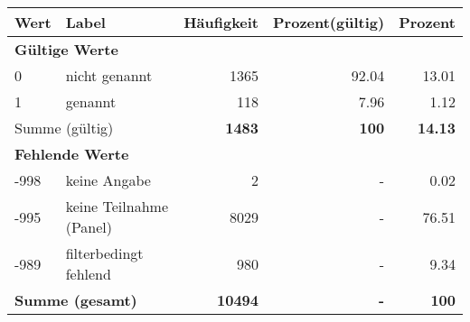     \begin{longtable}{lXrrr}
     \toprule
     \textbf{Wert} & \textbf{Label} & \textbf{Häufigkeit} & \textbf{Prozent(gültig)} & \textbf{Prozent} \\
     \endhead
     \midrule
     \multicolumn{5}{l}{\textbf{Gültige Werte}}\\

     0 &
     \multicolumn{1}{X}{ nicht genannt   } &


       \num{1365} &
       \num[round-mode=places,round-precision=2]{92.04} &
         \num[round-mode=places,round-precision=2]{13.01} \\

     1 &
     \multicolumn{1}{X}{ genannt   } &


       \num{118} &
       \num[round-mode=places,round-precision=2]{7.96} &
         \num[round-mode=places,round-precision=2]{1.12} \\
     \midrule
     \multicolumn{2}{l}{Summe (gültig)} &
       \textbf{\num{1483}} &
     \textbf{\num{100}} &
       \textbf{\num[round-mode=places,round-precision=2]{14.13}} \\
     \multicolumn{5}{l}{\textbf{Fehlende Werte}}\\
       -998 &
       keine Angabe &
         \num{2} &
        - &
         \num[round-mode=places,round-precision=2]{0.02} \\
       -995 &
       keine Teilnahme (Panel) &
         \num{8029} &
        - &
         \num[round-mode=places,round-precision=2]{76.51} \\
       -989 &
       filterbedingt fehlend &
         \num{980} &
        - &
         \num[round-mode=places,round-precision=2]{9.34} \\
     \midrule
     \multicolumn{2}{l}{\textbf{Summe (gesamt)}} &
          \textbf{\num{10494}} &
        \textbf{-} &
        \textbf{\num{100}} \\
     \bottomrule
     \end{longtable}
     
